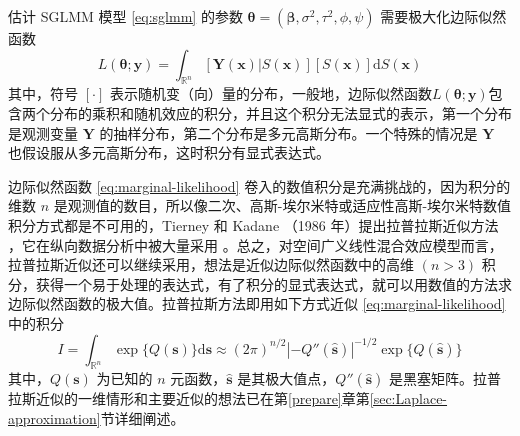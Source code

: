 \documentclass[12pt,a4paper,UTF8,twoside]{book}
\theoremstyle{definition}
\theoremstyle{definition}
\theoremstyle{definition}
\theoremstyle{remark}
\begin{document}
估计 SGLMM 模型 \eqref{eq:sglmm} 的参数
\(\boldsymbol{\theta} = (\boldsymbol{\beta},\sigma^2,\tau^2,\phi,\psi)\)
需要极大化边际似然函数 \begin{equation}
L(\boldsymbol{\theta};\mathbf{y}) = \int_{\mathbb{R}^n} [\mathbf{Y(x)}|S(\mathbf{x})][S(\mathbf{x})]\mathrm{d}S(\mathbf{x}) \label{eq:marginal-likelihood}
\end{equation} \noindent 其中，符号 \([\cdot]\)
表示随机变（向）量的分布，一般地，边际似然函数\(L(\boldsymbol{\theta};\mathbf{y})\)包含两个分布的乘积和随机效应的积分，并且这个积分无法显式的表示，第一个分布是观测变量
\(\mathbf{Y}\) 的抽样分布，第二个分布是多元高斯分布。一个特殊的情况是
\(\mathbf{Y}\) 也假设服从多元高斯分布，这时积分有显式表达式。

边际似然函数 \eqref{eq:marginal-likelihood}
卷入的数值积分是充满挑战的，因为积分的维数 \(n\)
是观测值的数目，所以像二次、高斯-埃尔米特或适应性高斯-埃尔米特数值积分方式都是不可用的，Tierney
和 Kadane （1986 年）提出拉普拉斯近似方法
\citep{Tierney1986}，它在纵向数据分析中被大量采用
\citep{Diggle2002Analysis}。总之，对空间广义线性混合效应模型而言，拉普拉斯近似还可以继续采用，想法是近似边际似然函数中的高维
\((n > 3)\)
积分，获得一个易于处理的表达式，有了积分的显式表达式，就可以用数值的方法求边际似然函数的极大值。拉普拉斯方法即用如下方式近似
\eqref{eq:marginal-likelihood} 中的积分 \begin{equation}
I   =  \int_{\mathbb{R}^n} \exp\{Q(\mathbf{s})\}\mathrm{d}\mathbf{s} 
  \approx  (2\pi)^{n/2} |-Q''(\hat{\mathbf{s}})|^{-1/2}\exp\{Q(\hat{\mathbf{s}})\} \label{eq:laplace-approximate}
\end{equation} \noindent 其中，\(Q(\mathbf{s})\) 为已知的 \(n\)
元函数，\(\hat{\mathbf{s}}\) 是其极大值点，\(Q''(\hat{\mathbf{s}})\)
是黑塞矩阵。拉普拉斯近似的一维情形和主要近似的想法已在第\ref{prepare}章第\ref{sec:Laplace-approximation}节详细阐述。
\end{document}
